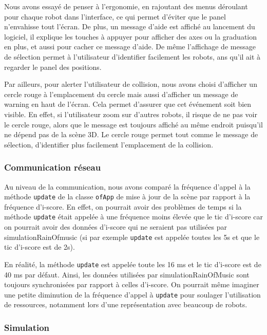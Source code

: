 Nous avons essayé de penser à l'ergonomie, en rajoutant des menus déroulant pour chaque robot dans l'interface, ce qui permet d'éviter que le panel n'envahisse tout l'écran. De plus, un message d'aide est affiché au lancement du logiciel, il explique les touches à appuyer pour afficher des axes ou la graduation en plus, et aussi pour cacher ce message d'aide.
De même l'affichage de message de sélection permet à l'utilisateur d'identifier facilement les robots,  ans qu'il ait à regarder le panel des positions.

Par ailleurs, pour alerter l'utilisateur de collision, nous avons choisi d'afficher un cercle rouge à l'emplacement du cercle mais aussi d'afficher un message de warning en haut de l'écran. Cela permet d'assurer que cet événement soit bien visible. En effet, si l'utilisateur zoom sur d'autres robots, il risque de ne pas voir le cercle rouge, alors que le message est toujours affiché au même endroit puisqu'il ne dépend pas de la scène 3D. Le cercle rouge permet tout comme le message de sélection, d'identifier plus facilement l'emplacement de la collision.

\subsubsection{Communication réseau}

Au niveau de la communication, nous avons comparé la fréquence d'appel à la méthode \verb|update| de la classe \verb|ofApp| de mise à jour de la scène par rapport à la fréquence d'i-score. En effet, on pourrait avoir des problèmes de temps si la méthode \verb|update| était appelée à une fréquence moins élevée que le tic d'i-score car on pourrait avoir des données d'i-score qui ne seraient pas utilisées par simulationRainOfmusic (si par exemple \verb|update| est appelée toutes les 5s et que le tic d'i-score est de 2s). 

En réalité, la méthode \verb|update| est appelée toute les 16 ms et le tic d'i-score est de 40 ms par défaut. Ainsi, les données utilisées par simulationRainOfMusic sont toujours synchronisées par rapport à celles d'i-score. On pourrait même imaginer une petite diminution de la fréquence d'appel à \verb|update| pour soulager l'utilisation de ressources, notamment lors d'une représentation avec beaucoup de robots. 

\subsubsection{Simulation}

